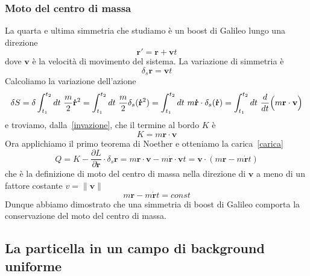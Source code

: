 \begin{example}
    \subsubsection{Moto del centro di massa}
        La quarta e ultima simmetria che studiamo è un boost di Galileo lungo una direzione
    \begin{equation*}
        \mathbf r' = \mathbf r + \mathbf v t
    \end{equation*}
        dove $\mathbf v$ è la velocità di movimento del sistema. La variazione di simmetria è 
    \begin{equation*}
        \delta_s \mathbf r = \mathbf v t
    \end{equation*}
        Calcoliamo la variazione dell'azione
    \begin{equation*}
        \delta S = \delta \int_{t_1}^{t_2}dt~ \frac{m}{2} \mathbf{\dot r}^2 = \int_{t_1}^{t_2}dt~ \frac{m}{2} \delta_s (\mathbf{\dot r}^2) = \int_{t_1}^{t_2}dt~ m \mathbf {\dot r} \cdot \delta_s (\mathbf{\dot r})= \int_{t_1}^{t_2}dt~ \frac{d}{dt} \Big( m \mathbf r \cdot \mathbf v \Big) 
    \end{equation*}
        e troviamo, dalla~\eqref{invazione}, che il termine al bordo $K$ è 
    \begin{equation*}
        K = m \mathbf r \cdot \mathbf v 
    \end{equation*}
        Ora applichiamo il primo teorema di Noether e otteniamo la carica~\eqref{carica} 
    \begin{equation*}
        Q = K - \frac{\partial L}{\partial \mathbf{\dot r}} \cdot \delta_s \mathbf r =  m \mathbf r \cdot \mathbf v - m \mathbf{\dot r} \cdot \mathbf v t = \mathbf v \cdot (m \mathbf r - m \mathbf{\dot r} t)
    \end{equation*}
        che è la definizione di moto del centro di massa nella direzione di $\mathbf v$ a meno di un fattore costante $v = \|\mathbf v \|$
    \begin{equation*}
        m \mathbf r - m \mathbf{\dot r} t = const
    \end{equation*}
        Dunque abbiamo dimostrato che una simmetria di boost di Galileo comporta la conservazione del moto del centro di massa.

    \end{example}

\subsection{La particella in un campo di background uniforme}

